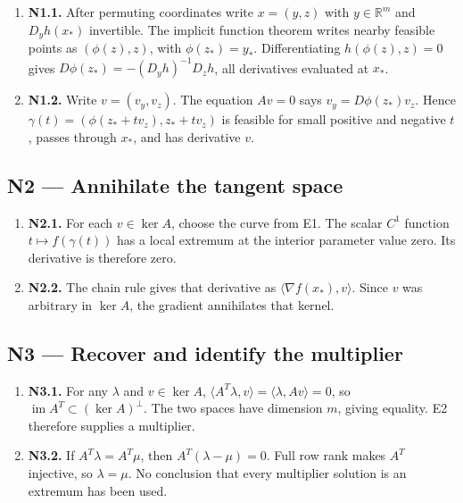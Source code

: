 \documentclass[preprint,12pt,aps,pra,showkeys,amsmath,amssymb,superscriptaddress,floatfix]{revtex4-2}
\theoremstyle{definition}
\theoremstyle{remark}
\begin{document}
\begin{enumerate}
\def\labelenumi{\arabic{enumi}.}
\item
  \textbf{N1.1.} After permuting coordinates write \(x=(y,z)\) with
  \(y\in\mathbb R^m\) and \(D_yh(x_*)\) invertible. The implicit
  function theorem writes nearby feasible points as \((\phi(z),z)\),
  with \(\phi(z_*)=y_*\). Differentiating \(h(\phi(z),z)=0\) gives
  \(D\phi(z_*)=-(D_yh)^{-1}D_zh\), all derivatives evaluated at \(x_*\).
\item
  \textbf{N1.2.} Write \(v=(v_y,v_z)\). The equation \(Av=0\) says
  \(v_y=D\phi(z_*)v_z\). Hence \(\gamma(t)=(\phi(z_*+tv_z),z_*+tv_z)\)
  is feasible for small positive and negative \(t\), passes through
  \(x_*\), and has derivative \(v\).
\end{enumerate}

\subsection{N2 --- Annihilate the tangent
space}\label{n2-annihilate-the-tangent-space}

\begin{enumerate}
\def\labelenumi{\arabic{enumi}.}
\item
  \textbf{N2.1.} For each \(v\in\ker A\), choose the curve from E1. The
  scalar \(C^1\) function \(t\mapsto f(\gamma(t))\) has a local extremum
  at the interior parameter value zero. Its derivative is therefore
  zero.
\item
  \textbf{N2.2.} The chain rule gives that derivative as
  \(\langle\nabla f(x_*),v\rangle\). Since \(v\) was arbitrary in
  \(\ker A\), the gradient annihilates that kernel.
\end{enumerate}

\subsection{N3 --- Recover and identify the
multiplier}\label{n3-recover-and-identify-the-multiplier}

\begin{enumerate}
\def\labelenumi{\arabic{enumi}.}
\item
  \textbf{N3.1.} For any \(\lambda\) and \(v\in\ker A\),
  \(\langle A^T\lambda,v\rangle=\langle\lambda,Av\rangle=0\), so
  \(\operatorname{im}A^T\subset(\ker A)^\perp\). The two spaces have
  dimension \(m\), giving equality. E2 therefore supplies a multiplier.
\item
  \textbf{N3.2.} If \(A^T\lambda=A^T\mu\), then \(A^T(\lambda-\mu)=0\).
  Full row rank makes \(A^T\) injective, so \(\lambda=\mu\). No
  conclusion that every multiplier solution is an extremum has been
  used.
\end{enumerate}
\end{document}

